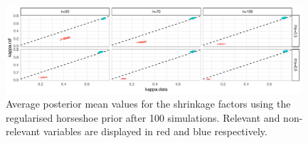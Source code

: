 \documentclass[american,]{article}
\theoremstyle{definition}
\begin{document}
\begin{figure}[tp]
  \centering
  \includegraphics[width=0.98\textwidth]{graphics/k_RHS.pdf}
  \caption{Average posterior mean values for the shrinkage factors using the regularised horseshoe prior after 100 simulations. Relevant and non-relevant variables are displayed in red and blue respectively.\\}
  \label{fig:k}
\end{figure}
\end{document}
